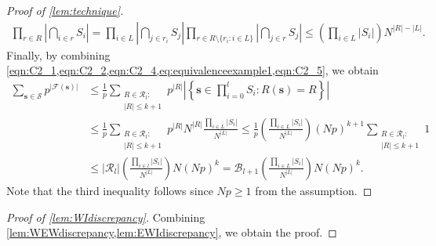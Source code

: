 \documentclass[letterpaper,11pt]{article}
\newcommand{\Vsize}{N}
\newcommand{\pmax}{p}
\newcommand{\Es}{F}
\begin{document}
\begin{proof}[Proof of \cref{lem:technique}]
\begin{align}
\prod_{r\in R}\left|\bigcap_{i\in r}S_i\right|
=\prod_{i\in L}\left|\bigcap_{j\in r_i}S_j\right|\prod_{r\in R\setminus \{r_i: i\in L\}}\left|\bigcap_{j\in r}S_j\right|
\leq \left(\prod_{i\in L}|S_i|\right) \Vsize^{|R|-|L|}. \label{eqn:C2_5}
\end{align}
Finally, by combining \cref{eqn:C2_1,eqn:C2_2,eqn:C2_4,eq:equivalenceexample1,eqn:C2_5}, we obtain
\begin{align*}
\sum_{\mathbf{s}\in \mathcal{S}}p^{|\mathcal{\Es}(\mathbf{s})|}
&\leq \frac{1}{p}\sum_{\substack{R\in \mathcal{R}_{l}:\\|R|\leq k+1}}p^{|R|}\left|\left\{\mathbf{s}\in \prod_{i=0}^l S_i: R(\mathbf{s})=R\right\}\right| \\
&\leq  \frac{1}{p}\sum_{\substack{R\in \mathcal{R}_{l}:\\|R|\leq k+1}} p^{|R|} \Vsize^{|R|}\frac{\prod_{i\in L}|S_{i}|}{\Vsize^{|L|}}
\leq \frac{1}{p}\left(\frac{\prod_{i\in L}|S_{i}|}{\Vsize^{|L|}}\right) (\Vsize \pmax)^{k+1} \sum_{\substack{R\in \mathcal{R}_{l}:\\|R|\leq k+1}} 1\\
&\leq |\mathcal{R}_{l}| \left(\frac{\prod_{i\in l}|S_{i}|}{\Vsize^{|L|}}\right) \Vsize (\Vsize \pmax)^k
= \mathcal{B}_{l+1}\left(\frac{\prod_{i\in L}|S_{i}|}{\Vsize^{|L|}}\right) \Vsize (\Vsize \pmax)^k.
\end{align*}
Note that the third inequality follows since $\Vsize p\geq 1$ from the assumption.
%
\end{proof}
%

\begin{proof}[Proof of \cref{lem:WIdiscrepancy}]
Combining \cref{lem:WEWdiscrepancy,lem:EWIdiscrepancy}, we obtain the proof.
\end{proof}
\end{document}
